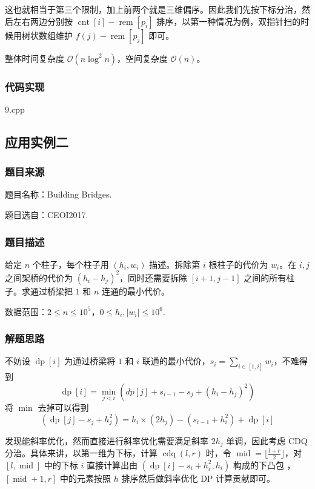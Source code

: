这也就相当于第三个限制，加上前两个就是三维偏序。因此我们先按下标分治，然后左右两边分别按
\(\operatorname{cnt}[i]-\operatorname{rem}[p_i]\)
排序，以第一种情况为例，双指针扫的时候用树状数组维护
\(f(j)-\operatorname{rem}[p_j]\) 即可。

整体时间复杂度 \(\mathcal{O}(n \log^2 n)\)，空间复杂度
\(\mathcal{O}(n)\)。

\subsubsection{代码实现}

9.cpp

\subsection{应用实例二}

\subsubsection{题目来源}

题目名称：Building Bridges.

题目选自：CEOI2017.

\subsubsection{题目描述}

给定 \(n\) 个柱子，每个柱子用 \((h_i,w_i)\) 描述。拆除第 \(i\)
根柱子的代价为 \(w_i\)。在 \(i,j\) 之间架桥的代价为
\((h_i-h_j)^2\)，同时还需要拆除 \([i+1,j-1]\)
之间的所有柱子。求通过桥梁把 \(1\) 和 \(n\) 连通的最小代价。

数据范围：\(2\leq n\leq 10^5\)，\(0\leq h_i,|w_i|\leq 10^6\).

\subsubsection{解题思路}

不妨设 \(\operatorname{dp}[i]\) 为通过桥梁将 \(1\) 和 \(i\)
联通的最小代价，\(s_i=\sum_{i\in[1,i]}w_i\)，不难得到 \[
\operatorname{dp}[i]=\min_{j\lt i}(dp[j]+s_{i-1}-s_j+(h_i-h_j)^2)
\] 将 \(\min\) 去掉可以得到 \[
(\operatorname{dp}[j]-s_j+h_j^2)=h_i\times(2h_j)-(s_{i-1}+h_i^2)+\operatorname{dp}[i]
\]

发现能斜率优化，然而直接进行斜率优化需要满足斜率 \(2h_j\) 单调，因此考虑
CDQ 分治。具体来讲，以第一维为下标，计算 \(\operatorname{cdq}(l,r)\)
时，令 \(\operatorname{mid}=\lfloor\frac{l+r}{2}\rfloor\)，对
\([l,\operatorname{mid}]\) 中的下标 \(i\) 直接计算出由
\((\operatorname{dp}[i]-s_i+h_i^2,h_i)\) 构成的下凸包
，\([\operatorname{mid}+1,r]\) 中的元素按照 \(h\) 排序然后做斜率优化 DP
计算贡献即可。

